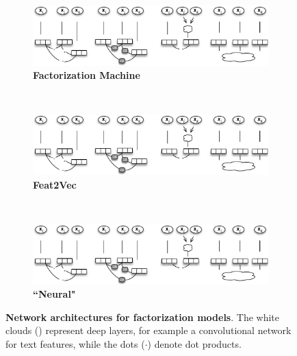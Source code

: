 \documentclass[letterpaper]{article}
\begin{document}
\begin{figure}[th]
    \centering
    \begin{subfigure}[t]{0.26\textwidth}
        \centering
        \includegraphics[width=.55\textwidth]{img/diagram_mf.pdf}
        \caption{\textbf{Factorization Machine}\label{fig:factorization_machine}}
    \end{subfigure}%
    ~
    \begin{subfigure}[t]{0.26\textwidth}
        \centering
        \includegraphics[width=.5\textwidth]{img/diagram_in.pdf}
        \caption{\textbf{Feat2Vec} \label{fig:feat2vec}}
    \end{subfigure}
    ~
    \begin{subfigure}[t]{0.26\textwidth}
        \centering
        \includegraphics[width=.6\textwidth]{img/diagram_nmf.pdf}
        \caption{\textbf{``Neural"} \label{fig:neural}}
    \end{subfigure}
    \caption{\textbf{Network architectures for factorization models}.  The  white clouds (\Cloud) represent deep layers, for example a convolutional network for text features, while the dots ($\cdot$) denote dot products.
    \label{fig:architecture}
    }
\end{figure}
\end{document}

